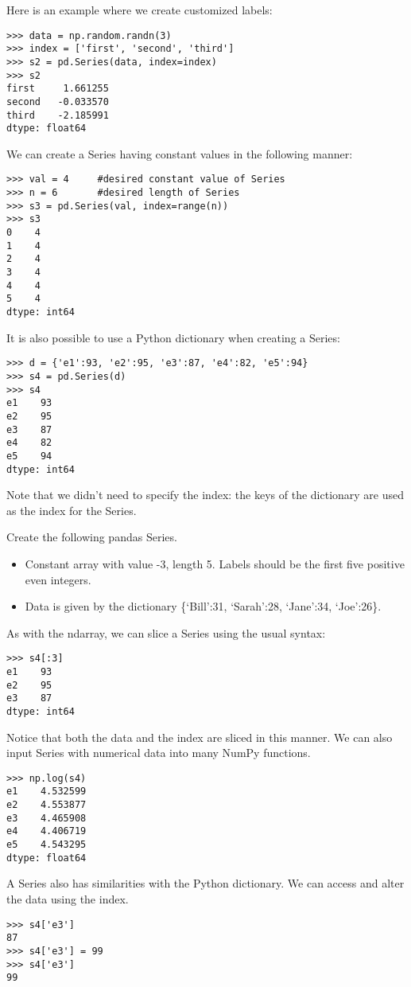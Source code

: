 Here is an example where we create customized labels:
\begin{lstlisting}
>>> data = np.random.randn(3)
>>> index = ['first', 'second', 'third']
>>> s2 = pd.Series(data, index=index)
>>> s2
first     1.661255
second   -0.033570
third    -2.185991
dtype: float64
\end{lstlisting}

We can create a Series having constant values in the following manner:
\begin{lstlisting}
>>> val = 4     #desired constant value of Series
>>> n = 6       #desired length of Series
>>> s3 = pd.Series(val, index=range(n))
>>> s3
0    4
1    4
2    4
3    4
4    4
5    4
dtype: int64
\end{lstlisting}

It is also possible to use a Python dictionary when creating a Series:
\begin{lstlisting}
>>> d = {'e1':93, 'e2':95, 'e3':87, 'e4':82, 'e5':94}
>>> s4 = pd.Series(d)
>>> s4
e1    93
e2    95
e3    87
e4    82
e5    94
dtype: int64
\end{lstlisting}
Note that we didn't need to specify the index: the keys of the dictionary are used as the index for the Series.

\begin{problem}
Create the following pandas Series.

\begin{itemize}
\item Constant array with value -3, length 5. Labels should be the first five positive even integers.

\item Data is given by the dictionary \{`Bill':31, `Sarah':28, `Jane':34, `Joe':26\}.
\end{itemize}
\end{problem}

As with the ndarray, we can slice a Series using the usual syntax:
\begin{lstlisting}
>>> s4[:3]
e1    93
e2    95
e3    87
dtype: int64
\end{lstlisting}
Notice that both the data and the index are sliced in this manner.
We can also input Series with numerical data into many NumPy functions.
\begin{lstlisting}
>>> np.log(s4)
e1    4.532599
e2    4.553877
e3    4.465908
e4    4.406719
e5    4.543295
dtype: float64
\end{lstlisting}

A Series also has similarities with the Python dictionary.
We can access and alter the data using the index.
\begin{lstlisting}
>>> s4['e3']
87
>>> s4['e3'] = 99
>>> s4['e3']
99
\end{lstlisting}

